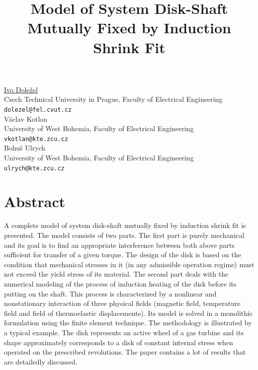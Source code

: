 \documentclass[article, A4, 11pt]{llncs}%
\begin{document}
\title{Model of System Disk-Shaft Mutually Fixed by Induction Shrink Fit}
 \author{} \institute{}
\maketitle
\begin{center}
{\large \underline{Ivo Doležel}}\\
Czech Technical University in Prague, Faculty of Electrical Engineering\\
{\tt dolezel@fel.cvut.cz}
\\ \vspace{4mm}
{\large Václav Kotlan}\\
University of West Bohemia, Faculty of Electrical Engineering\\
{\tt vkotlan@kte.zcu.cz}
\\ \vspace{4mm}
{\large Bohuš  Ulrych}\\
University of West Bohemia, Faculty of Electrical Engineering\\
{\tt ulrych@kte.zcu.cz}
\end{center}

\section*{Abstract}
A complete model of system disk-shaft mutually fixed by induction shrink fit is presented. The model consists of two parts. The first part is purely mechanical and its goal is to find an appropriate interference between both above parts sufficient for transfer of a given torque. The design of the disk is based on the condition that mechanical stresses in it (in any admissible operation regime) must not exceed the yield stress of its material. The second part deals with the numerical modeling of the process of induction heating of the disk before its putting on the shaft. This process is characterized by a nonlinear and nonstationary interaction of three physical fields (magnetic field, temperature field and field of thermoelastic displacements). Its model is solved in a monolithic formulation using the finite element technique. The methodology is illustrated by a typical example. The disk represents an active wheel of a gas turbine and its shape approximately corresponds to a disk of constant internal stress when operated on the prescribed revolutions. The paper contains a lot of results that are detailedly discussed.
\end{document}

